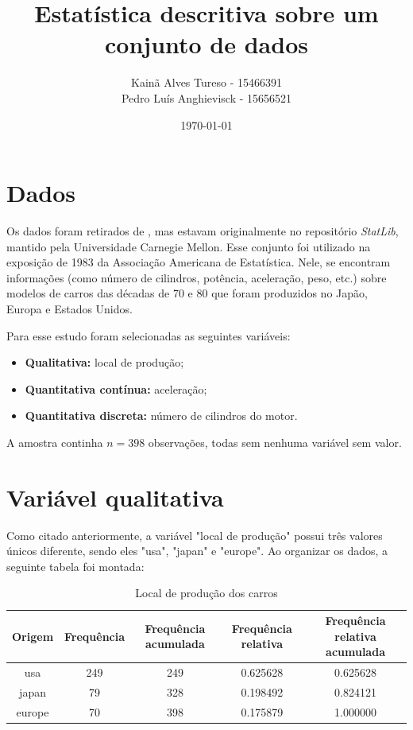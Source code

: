 \documentclass[brazil, a4paper, 12pt]{article}
\title{Estatística descritiva sobre um conjunto de dados}
\author{Kainã Alves Tureso - 15466391\\
        Pedro Luís Anghievisck - 15656521}
\date{\today}
\begin{document}
    \maketitle
    \tableofcontents
    \break

    \section{Dados}
    Os dados foram retirados de \cite{cars_data}, mas estavam originalmente no repositório \textit{StatLib}, mantido pela Universidade Carnegie Mellon. Esse conjunto foi utilizado na exposição de 1983 da Associação Americana de Estatística. Nele, se encontram informações (como número de cilindros, potência, aceleração, peso, etc.) sobre modelos de carros das décadas de 70 e 80 que foram produzidos no Japão, Europa e Estados Unidos.

    Para esse estudo foram selecionadas as seguintes variáveis:
    \begin{itemize}
        \item \textbf{Qualitativa:} local de produção;
        \item \textbf{Quantitativa contínua:} aceleração;
        \item \textbf{Quantitativa discreta:} número de cilindros do motor.
    \end{itemize}

    A amostra continha $n=398$ observações, todas sem nenhuma variável sem valor.

    \section{Variável qualitativa}
    Como citado anteriormente, a variável "local de produção" possui três valores únicos diferente, sendo eles "usa", "japan" e "europe". Ao organizar os dados, a seguinte tabela foi montada:
    \begin{table}[H]
        \centering
        \begin{tabular}{c|cc|cc}
            \toprule
            Origem & Frequência & Frequência acumulada & Frequência relativa & Frequência relativa acumulada \\
            \midrule
            usa & 249 & 249 & 0.625628 & 0.625628 \\
            japan & 79 & 328 & 0.198492 & 0.824121 \\
            europe & 70 & 398 & 0.175879 & 1.000000 \\
            \bottomrule
        \end{tabular}

        \caption{Local de produção dos carros}
        \label{table:local_producao}
    \end{table}
\end{document}

